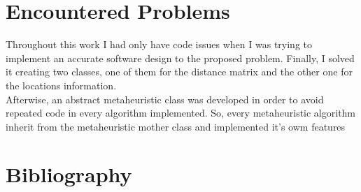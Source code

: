 \documentclass[preprint,14pt]{elsarticle}
\begin{document}
\section{Encountered Problems}
\label{S:problems}

Throughout this work I had only have code issues when I was trying to implement an accurate software design to the proposed problem. Finally, I solved it creating two classes, one of them for the distance matrix and the other one for the locations information. \\
Afterwise, an abstract metaheuristic class was developed in order to avoid repeated code in every algorithm implemented. So, every metaheuristic algorithm inherit from the metaheuristic mother class and implemented it's owm features

\break

\section{Bibliography}



\end{document}
